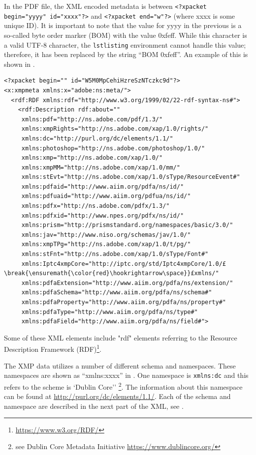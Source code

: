 In the PDF file, the XML encoded metadata is between \texttt{<?xpacket begin="yyyy" id="xxxx"?>} and \texttt{<?xpacket end="w"?>} (where xxxx is some unique ID). It is important to note that the value for yyyy in the previous is a so-called byte order marker (BOM) with the value 0xfeff. While this character is a valid \mbox{UTF-8} character, the \texttt{lstlisting} environment cannot handle this value; therefore, it has been replaced by the string ``BOM 0xfeff''. An example of this is shown in .
\clearpage
\begin{lstlisting}[style=myXML,
caption={First part of the XML metadata embedded in a PDF file (some reformatting has been done to fit the text in the boarders)}, label={lst:pdfinfoOutput}]
<?xpacket begin="﻿" id="W5M0MpCehiHzreSzNTczkc9d"?>
<x:xmpmeta xmlns:x="adobe:ns:meta/">
  <rdf:RDF xmlns:rdf="http://www.w3.org/1999/02/22-rdf-syntax-ns#">
    <rdf:Description rdf:about=""
     xmlns:pdf="http://ns.adobe.com/pdf/1.3/"
     xmlns:xmpRights="http://ns.adobe.com/xap/1.0/rights/"
     xmlns:dc="http://purl.org/dc/elements/1.1/"
     xmlns:photoshop="http://ns.adobe.com/photoshop/1.0/"
     xmlns:xmp="http://ns.adobe.com/xap/1.0/"
     xmlns:xmpMM="http://ns.adobe.com/xap/1.0/mm/"
     xmlns:stEvt="http://ns.adobe.com/xap/1.0/sType/ResourceEvent#"
     xmlns:pdfaid="http://www.aiim.org/pdfa/ns/id/"
     xmlns:pdfuaid="http://www.aiim.org/pdfua/ns/id/"
     xmlns:pdfx="http://ns.adobe.com/pdfx/1.3/"
     xmlns:pdfxid="http://www.npes.org/pdfx/ns/id/"
     xmlns:prism="http://prismstandard.org/namespaces/basic/3.0/"
     xmlns:jav="http://www.niso.org/schemas/jav/1.0/"
     xmlns:xmpTPg="http://ns.adobe.com/xap/1.0/t/pg/"
     xmlns:stFnt="http://ns.adobe.com/xap/1.0/sType/Font#"
     xmlns:Iptc4xmpCore="http://iptc.org/std/Iptc4xmpCore/1.0/£\break{\ensuremath{\color{red}\hookrightarrow\space}}£xmlns/"
     xmlns:pdfaExtension="http://www.aiim.org/pdfa/ns/extension/"
     xmlns:pdfaSchema="http://www.aiim.org/pdfa/ns/schema#"
     xmlns:pdfaProperty="http://www.aiim.org/pdfa/ns/property#"
     xmlns:pdfaType="http://www.aiim.org/pdfa/ns/type#"
     xmlns:pdfaField="http://www.aiim.org/pdfa/ns/field#">
\end{lstlisting}

Some of these XML elements include "rdf" elements referring to the Resource Description Framework (RDF)\footnote{\url{https://www.w3.org/RDF/}}.

The XMP data utilizes a number of different schema and namespaces. These namespaces are shown as ``xmlns:xxxx''  in . One namespace is \texttt{xmlns:dc} and this refers to the scheme is `Dublin Core'' \footnote{see Dublin Core Metadata Initiative \url{https://www.dublincore.org/}}. The information about this namespace can be found at \url{http://purl.org/dc/elements/1.1/}. Each of the schema and namespace are described in the next part of the XML, see .

